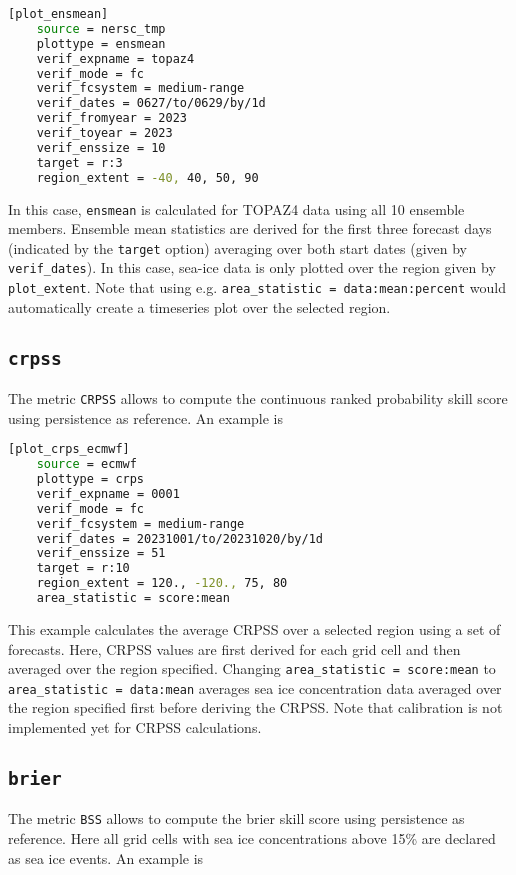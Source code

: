 \documentclass[DIV=10, parskip=full]{scrreprt}
\newcommand{\notimplement}[1]{#1}
\begin{document}
\begin{lstlisting}[language=bash]
	[plot_ensmean]
	source = nersc_tmp
	plottype = ensmean
	verif_expname = topaz4
	verif_mode = fc
	verif_fcsystem = medium-range
	verif_dates = 0627/to/0629/by/1d
	verif_fromyear = 2023
	verif_toyear = 2023
	verif_enssize = 10
	target = r:3
	region_extent = -40, 40, 50, 90
\end{lstlisting}

In this case, \texttt{ensmean} is calculated for TOPAZ4 data using all 10 ensemble members. Ensemble mean statistics are derived for the first three forecast days (indicated by the \texttt{target} option) averaging over both start dates (given by \texttt{verif\_dates}). In this case, sea-ice data is only plotted over the region given by \texttt{plot\_extent}. Note that using e.g. \texttt{area\_statistic = data:mean:percent} would automatically create a timeseries plot over the selected region.

\subsection{\texttt{crpss}}
The metric \texttt{CRPSS} allows to compute the continuous ranked probability skill score using persistence as reference. An example is

\begin{lstlisting}[language=bash]
	[plot_crps_ecmwf]
	source = ecmwf
	plottype = crps
	verif_expname = 0001
	verif_mode = fc
	verif_fcsystem = medium-range
	verif_dates = 20231001/to/20231020/by/1d
	verif_enssize = 51
	target = r:10
	region_extent = 120., -120., 75, 80
	area_statistic = score:mean
\end{lstlisting}
This example calculates the average CRPSS over a selected region using a set of forecasts. Here, CRPSS values are first derived for each grid cell and then averaged over the region specified. Changing \texttt{area\_statistic = score:mean} to \texttt{area\_statistic = data:mean}  averages sea ice concentration data averaged over the region specified first before deriving the CRPSS. \notimplement{Note that calibration is not implemented yet for CRPSS calculations.}


\subsection{\texttt{brier}}
The metric \texttt{BSS} allows to compute the brier skill score using persistence as reference. Here all grid cells with sea ice concentrations above 15\% are declared as sea ice events. An example is
\end{document}
